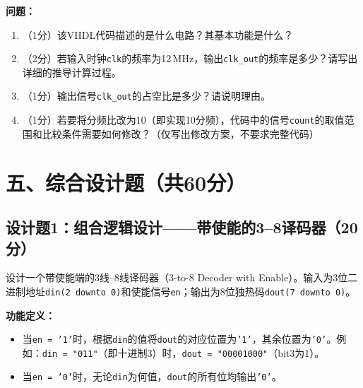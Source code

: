 \begin{framed}
\textbf{问题：}
\begin{enumerate}[label=(\arabic*)]
  \item （1分）该VHDL代码描述的是什么电路？其基本功能是什么？
  \item （2分）若输入时钟\texttt{clk}的频率为12\,MHz，输出\texttt{clk\_out}的频率是多少？请写出详细的推导计算过程。
  \item （1分）输出信号\texttt{clk\_out}的占空比是多少？请说明理由。
  \item （1分）若要将分频比改为10（即实现10分频），代码中的信号\texttt{count}的取值范围和比较条件需要如何修改？（仅写出修改方案，不要求完整代码）
\end{enumerate}
\end{framed}

\newpage

\section*{五、综合设计题（共60分）}

\subsection*{设计题1：组合逻辑设计——带使能的3--8译码器（20分）}

设计一个带使能端的3线--8线译码器（3-to-8 Decoder with Enable）。输入为3位二进制地址\texttt{din(2~downto~0)}和使能信号\texttt{en}；输出为8位独热码\texttt{dout(7~downto~0)}。

\textbf{功能定义：}
\begin{itemize}
  \item 当\texttt{en = '1'}时，根据\texttt{din}的值将\texttt{dout}的对应位置为\texttt{'1'}，其余位置为\texttt{'0'}。例如：\texttt{din = "011"}（即十进制3）时，\texttt{dout = "00001000"}（bit3为1）。
  \item 当\texttt{en = '0'}时，无论\texttt{din}为何值，\texttt{dout}的所有位均输出\texttt{'0'}。
\end{itemize}

